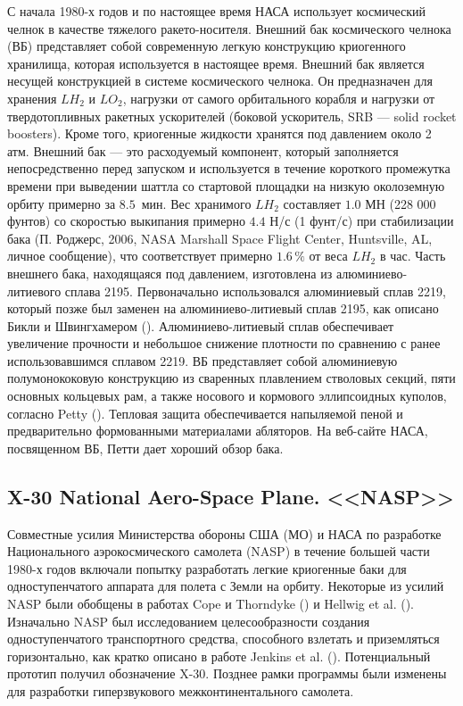 С начала 1980-х годов и по настоящее время НАСА использует космический челнок в качестве тяжелого ракето-носителя. Внешний бак космического челнока (ВБ) представляет собой современную легкую конструкцию криогенного хранилища, которая используется в настоящее время. Внешний бак является несущей конструкцией в системе космического челнока. Он предназначен для хранения \(LH_2\) и \(LO_2\), нагрузки от самого орбитального корабля и нагрузки от твердотопливных ракетных ускорителей (боковой ускоритель, SRB ---  solid rocket boosters). Кроме того,  криогенные жидкости хранятся под давлением около 2 атм. Внешний бак --- это расходуемый компонент, который заполняется непосредственно перед запуском и используется в течение короткого промежутка времени при выведении шаттла со стартовой площадки на низкую околоземную орбиту примерно за \(8.5\)~мин. Вес хранимого \(LH_2\) составляет \(1.0\) МН (228 000 фунтов) со скоростью выкипания примерно \(4.4\) Н/с (1 фунт/с) при стабилизации бака (П. Роджерс, 2006, NASA Marshall Space Flight Center, Huntsville, AL, личное сообщение), что соответствует примерно \(1.6\,\%\) от веса \(LH_2\) в час.  Часть внешнего бака, находящаяся под давлением, изготовлена из алюминиево-литиевого сплава 2195. Первоначально использовался алюминиевый сплав 2219, который позже был заменен на алюминиево-литиевый сплав 2195, как описано Бикли и Швингхамером (\cite{bickleyschwinghame1999}). Алюминиево-литиевый сплав обеспечивает увеличение прочности и небольшое снижение плотности по сравнению с ранее использовавшимся сплавом 2219.  ВБ представляет собой алюминиевую полумонококовую конструкцию из сваренных плавлением стволовых секций, пяти основных кольцевых рам, а также носового и кормового эллипсоидных куполов, согласно Petty (\cite{petty2006}). Тепловая защита обеспечивается напыляемой пеной и предварительно формованными материалами абляторов. На веб-сайте НАСА, посвященном ВБ, Петти дает хороший обзор бака.


\subsection{X-30 National Aero-Space Plane. <<NASP>>}\label{ch:overview:1:sec3:sub4}

Совместные усилия Министерства обороны США (МО) и НАСА по разработке Национального аэрокосмического самолета (NASP) в течение большей части 1980-х годов включали попытку разработать легкие криогенные баки для одноступенчатого аппарата для полета с Земли на орбиту. Некоторые из усилий NASP были обобщены в работах Cope и Thorndyke (\cite{copethorndyke1992}) и Hellwig et al. (\cite{hellwig1992}). Изначально NASP был исследованием целесообразности создания одноступенчатого транспортного средства, способного взлетать и приземляться горизонтально, как кратко описано в работе Jenkins et al. (\cite{jenkins2003}). Потенциальный прототип получил обозначение X-30. Позднее рамки программы были изменены для разработки гиперзвукового межконтинентального самолета. 

